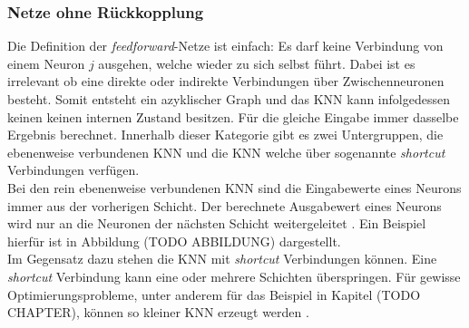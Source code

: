 \subsubsection{Netze ohne Rückkopplung} %
Die Definition der \emph{feedforward}-Netze ist einfach: Es darf keine Verbindung von einem Neuron $j$ ausgehen, welche wieder zu sich selbst führt. Dabei ist es irrelevant ob eine direkte oder indirekte Verbindungen über Zwischenneuronen besteht. Somit entsteht ein azyklischer Graph \cite{zell2003simulation} und das \ac{KNN} kann infolgedessen keinen keinen internen Zustand besitzen. Für die gleiche Eingabe immer dasselbe Ergebnis berechnet. Innerhalb dieser Kategorie gibt es zwei Untergruppen, die ebenenweise verbundenen \ac{KNN} und die \ac{KNN} welche über sogenannte \emph{shortcut} Verbindungen verfügen.\\
Bei den rein ebenenweise verbundenen \ac{KNN} sind die Eingabewerte eines Neurons immer aus der vorherigen Schicht. Der berechnete Ausgabewert eines Neurons wird nur an die Neuronen der nächsten Schicht weitergeleitet \cite{zell2003simulation}. Ein Beispiel hierfür ist in Abbildung (TODO ABBILDUNG) dargestellt.\\ %
Im Gegensatz dazu stehen die \ac{KNN} mit \emph{shortcut} Verbindungen können. Eine \emph{shortcut} Verbindung kann eine oder mehrere Schichten überspringen. Für gewisse Optimierungsprobleme, unter anderem für das Beispiel in Kapitel (TODO CHAPTER), können so kleiner \ac{KNN} erzeugt werden \cite{zell2003simulation}. 

